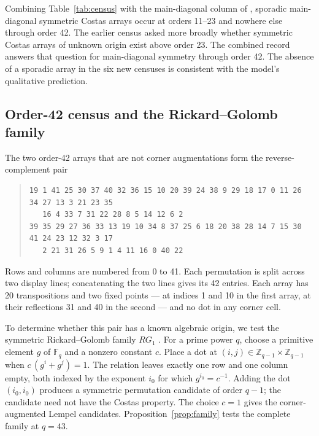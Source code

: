 \documentclass[11pt]{article}
\begin{document}
Combining Table~\ref{tab:census} with the main-diagonal column of
\cite{RickardDrakakis2009Symmetry}, sporadic main-diagonal symmetric
Costas arrays occur at orders 11--23 and nowhere else through order 42.
The earlier census asked more broadly whether symmetric Costas arrays of
unknown origin exist above order 23.  The combined record answers that
question for main-diagonal symmetry through order 42.  The absence of a
sporadic array in the six new censuses is consistent with the model's
qualitative prediction.

\subsection{Order-42 census and the Rickard--Golomb family}
\label{sec:sporadic}

The two order-42 arrays that are not corner augmentations form the
reverse-complement pair
\begin{quote}\begin{footnotesize}\begin{verbatim}
19 1 41 25 30 37 40 32 36 15 10 20 39 24 38 9 29 18 17 0 11 26 34 27 13 3 21 23 35
   16 4 33 7 31 22 28 8 5 14 12 6 2
39 35 29 27 36 33 13 19 10 34 8 37 25 6 18 20 38 28 14 7 15 30 41 24 23 12 32 3 17
   2 21 31 26 5 9 1 4 11 16 0 40 22
\end{verbatim}\end{footnotesize}\end{quote}
Rows and columns are numbered from 0 to 41.  Each permutation is split
across two display lines; concatenating the two lines gives its 42
entries.  Each array has 20
transpositions and two fixed points --- at indices 1 and 10 in the first
array, at their reflections 31 and 40 in the second --- and no dot in
any corner cell.

To determine whether this pair has a known algebraic origin, we test the
symmetric Rickard--Golomb family $RG_{1}$
\cite{Rickard2004Periodicity,Drakakis2011OpenProblems}.  For a prime power
$q$, choose a primitive element $g$ of $\mathbb{F}_{q}$ and a nonzero
constant $c$.  Place a dot at
$(i,j)\in\mathbb{Z}_{q-1}\times\mathbb{Z}_{q-1}$ when
$c\,(g^{i}+g^{j})=1$.  The relation leaves exactly one row and one column
empty, both indexed by the exponent $i_{0}$ for which
$g^{i_{0}}=c^{-1}$.  Adding the dot $(i_{0},i_{0})$ produces a symmetric
permutation candidate of order $q-1$; the candidate need not have the
Costas property.  The choice $c=1$ gives the corner-augmented Lempel
candidates.  Proposition~\ref{prop:family} tests the complete family at
$q=43$.
\end{document}
